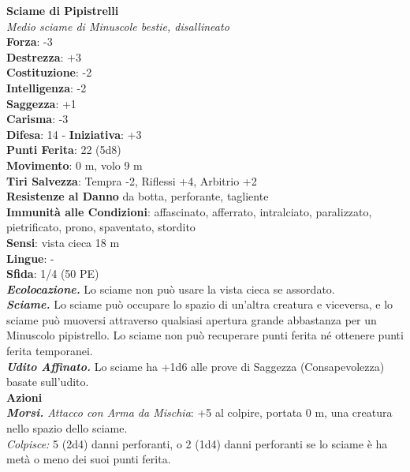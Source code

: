 \begin{multicols}{2}
\medskip\textbf{Sciame di Pipistrelli}\\
\emph{Medio sciame di Minuscole bestie, disallineato}\\
\textbf{Forza}: -3\\
\textbf{Destrezza}: +3\\
\textbf{Costituzione}: -2\\
\textbf{Intelligenza}: -2\\
\textbf{Saggezza}: +1\\
\textbf{Carisma}: -3\\
\textbf{Difesa}: 14 - \textbf{Iniziativa}: +3\\
\textbf{Punti Ferita}: 22 (5d8)\\
\textbf{Movimento}: 0 m, volo 9 m\\
\textbf{Tiri Salvezza}: Tempra -2, Riflessi +4, Arbitrio +2\\
\textbf{Resistenze al Danno} da botta, perforante, tagliente\\
\textbf{Immunità alle Condizioni}: affascinato, afferrato, intralciato, paralizzato, pietrificato, prono, spaventato, stordito\\
\textbf{Sensi}: vista cieca 18 m\\
\textbf{Lingue}: -\\
\textbf{Sfida}: 1/4 (50 PE)\smallskip\\
\emph{\textbf{Ecolocazione.}} Lo sciame non può usare la vista cieca se assordato.\\
\emph{\textbf{Sciame.}} Lo sciame può occupare lo spazio di un'altra creatura e viceversa, e lo sciame può muoversi attraverso qualsiasi apertura grande abbastanza per un Minuscolo pipistrello. Lo sciame non può recuperare punti ferita né ottenere punti ferita temporanei.\\
\emph{\textbf{Udito Affinato.}} Lo sciame ha +1d6 alle prove di Saggezza (Consapevolezza) basate sull'udito.\\
\smallskip\textbf{Azioni}\\
\emph{\textbf{Morsi.} Attacco con Arma da Mischia}: +5 al colpire, portata 0 m, una creatura nello spazio dello sciame.\\
\emph{Colpisce:} 5 (2d4) danni perforanti, o 2 (1d4) danni perforanti se lo sciame è ha metà o meno dei suoi punti ferita.\\


\end{multicols}
